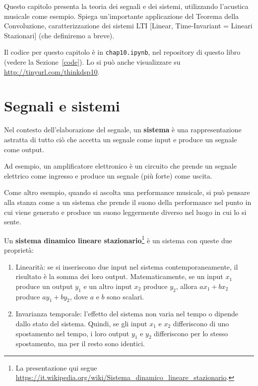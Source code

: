 \documentclass[12pt,a4paper]{book}
\begin{document}
Questo capitolo presenta la teoria dei segnali e dei sistemi, utilizzando l'acustica musicale come esempio. Spiega un'importante applicazione del Teorema della Convoluzione, caratterizzazione dei sistemi LTI [Linear, Time-Invariant = Lineari Stazionari] (che definiremo a breve).

Il codice per questo capitolo è in {\tt chap10.ipynb}, nel repository di questo libro (vedere la Sezione~\ref{code}). Lo si può anche visualizzare su \url{http://tinyurl.com/thinkdsp10}.

\section{Segnali e sistemi} 

Nel contesto dell'elaborazione del segnale, un {\bf sistema} è una rappresentazione astratta di tutto ciò che accetta un segnale come input e produce un segnale come output.

Ad esempio, un amplificatore elettronico è un circuito che prende un segnale elettrico come ingresso e produce un segnale (più forte) come uscita.

Come altro esempio, quando si ascolta una performance musicale, si può pensare alla stanza come a un sistema che prende il suono della performance nel punto in cui viene generato e produce un suono leggermente diverso nel luogo in cui lo si sente.

Un {\bf sistema dinamico lineare stazionario}\footnote{La presentazione qui segue \url{https://it.wikipedia.org/wiki/Sistema_dinamico_lineare_stazionario}.} è un sistema con queste due proprietà:

\begin{enumerate} 

\item Linearità: se si inseriscono due input nel sistema contemporaneamente, il risultato è la somma dei loro output. Matematicamente, se un input $x_1$ produce un output $y_1$ e un altro input $x_2$ produce $y_2$, allora $a x_1 + b x_2$ produce $a y_1 + b y_2$, dove $a$ e $b$ sono scalari.

\item Invarianza temporale: l'effetto del sistema non varia nel tempo o dipende dallo stato del sistema. Quindi, se gli input $x_1$ e $x_2$ differiscono di uno spostamento nel tempo, i loro output $y_1$ e $y_2$ differiscono per lo stesso spostamento, ma per il resto sono identici.

\end{enumerate} 
\end{document}
